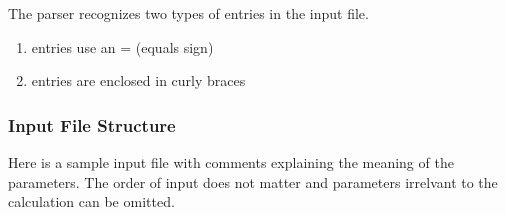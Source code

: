 \documentclass[letterpaper,10pt,english]{sphinxmanual}
\begin{document}
The parser recognizes two types of entries in the input file.
\begin{enumerate}
\item {} 
 entries use an = (equals sign)

\begin{sphinxVerbatim}[commandchars=\\\{\}]
  
\end{sphinxVerbatim}

\item {} 
 entries are enclosed in curly braces

\begin{sphinxVerbatim}[commandchars=\\\{\}]
 
      
   
   
\end{sphinxVerbatim}

\end{enumerate}


\subsubsection{Input File Structure}
\label{\detokenize{inputfile:input-file-structure}}
Here is a sample input file with comments explaining the meaning of the
parameters. The order of input does not matter and parameters irrelvant to the
calculation can be omitted.
\end{document}
